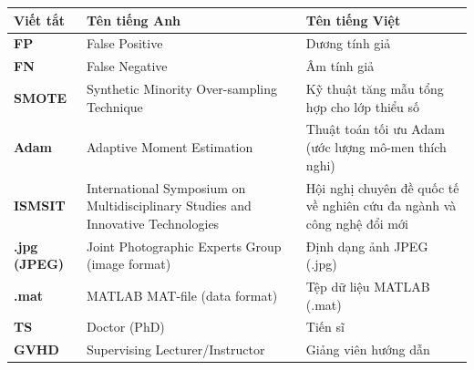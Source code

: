 \documentclass[../DoAn.tex]{subfiles}
\begin{document}
\begin{center}
\begin{tabular}{l  p{6cm} p{7cm}}
\end{tabular}

\begin{tabular}{l  p{6cm} p{7cm}}
\hline
\textbf{Viết tắt}  & \textbf{Tên tiếng Anh} & \textbf{Tên tiếng Việt} \\ \hline
\textbf{FP} & False Positive & Dương tính giả \\
\textbf{FN} & False Negative & Âm tính giả \\
\textbf{SMOTE} & Synthetic Minority Over-sampling Technique & Kỹ thuật tăng mẫu tổng hợp cho lớp thiểu số \\
\textbf{Adam} & Adaptive Moment Estimation & Thuật toán tối ưu Adam (ước lượng mô-men thích nghi) \\
\textbf{ISMSIT} & International Symposium on Multidisciplinary Studies and Innovative Technologies & Hội nghị chuyên đề quốc tế về nghiên cứu đa ngành và công nghệ đổi mới \\
\textbf{.jpg (JPEG)} & Joint Photographic Experts Group (image format) & Định dạng ảnh JPEG (.jpg) \\
\textbf{.mat} & MATLAB MAT-file (data format) & Tệp dữ liệu MATLAB (.mat) \\
\textbf{TS} & Doctor (PhD) & Tiến sĩ \\
\textbf{GVHD} & Supervising Lecturer/Instructor & Giảng viên hướng dẫn \\
\hline
\end{tabular}

\end{center}
\endgroup
\end{document}
